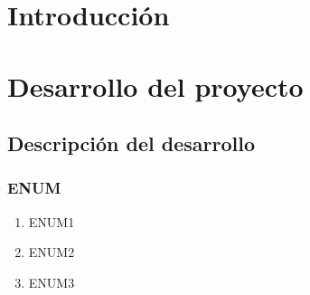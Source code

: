 \documentclass[10pt,a4paper]{article}
\begin{document}
\section{Introducción}


\cleardoublepage


\section{Desarrollo del proyecto}

\subsection{Descripción del desarrollo}




\subsubsection{ENUM}

	\begin{enumerate}
		\item ENUM1
		\item ENUM2
		\item ENUM3 
	\end{enumerate}
\end{document}
